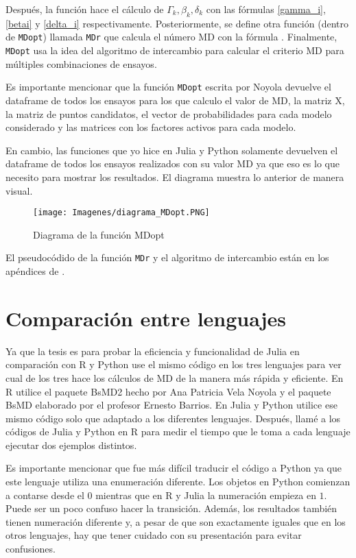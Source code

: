Después, la función hace el cálculo de $\Gamma_k, \beta_k, \delta_k$ con las fórmulas \ref{gamma_i}, \ref{betai} y \ref{delta_i} respectivamente. Posteriormente, se define otra función (dentro de \texttt{MDopt}) llamada \texttt{MDr} que calcula el número MD con la fórmula . Finalmente, \texttt{MDopt} usa la idea del algoritmo de intercambio para calcular el criterio MD para múltiples combinaciones de ensayos. 

Es importante mencionar que la función \texttt{MDopt} escrita por Noyola devuelve el dataframe de todos los ensayos para los que calculo el valor de MD, la matriz X, la matriz de puntos candidatos, el vector de probabilidades para cada modelo considerado y las matrices con los factores activos para cada modelo. 

En cambio, las funciones que yo hice en Julia y Python solamente devuelven el dataframe de todos los ensayos realizados con su valor MD ya que eso es lo que necesito para mostrar los resultados. El diagrama  muestra lo anterior de manera visual. 

\begin{figure}[h]
	\begin{center}
		\texttt{[image: Imagenes/diagrama\_MDopt.PNG]}
		\caption{Diagrama de la función MDopt}
		\label{diagrama_mdopt}
	\end{center}
\end{figure} 

El pseudocódido de la función \texttt{MDr} y el algoritmo de intercambio están en los apéndices de \cite{tesis_paty}.  



\section{Comparación entre lenguajes}

Ya que la tesis es para probar la eficiencia y funcionalidad de Julia en comparación con R y Python use el mismo código en los tres lenguajes para ver cual de los tres hace los cálculos de MD de la manera más rápida y eficiente. En R utilice el paquete BsMD2 hecho por Ana Patricia Vela Noyola y el paquete BsMD elaborado por el profesor Ernesto Barrios. En Julia y Python utilice ese mismo código solo que adaptado a los diferentes lenguajes. Después, llamé a los códigos de Julia y Python en R para medir el tiempo que le toma a cada lenguaje ejecutar dos ejemplos distintos. 

Es importante mencionar que fue más difícil traducir el código a Python ya que este lenguaje utiliza una enumeración diferente. Los objetos en Python comienzan a contarse desde el $0$ mientras que en R y Julia la numeración empieza en $1$. Puede ser un poco confuso hacer la transición. Además, los resultados también tienen numeración diferente y, a pesar de que son exactamente iguales que en los otros lenguajes, hay que tener cuidado con su presentación para evitar confusiones. 


